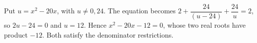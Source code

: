 Put $u=x^2-20x$, with $u\ne0,24$. The equation becomes $2+\dfrac{24}{(u-24)}+\dfrac{24}{u}=2$, so $2u-24=0$ and $u=12$. Hence $x^2-20x-12=0$, whose two real roots have product $\boxed{-12}$. Both satisfy the denominator restrictions.

